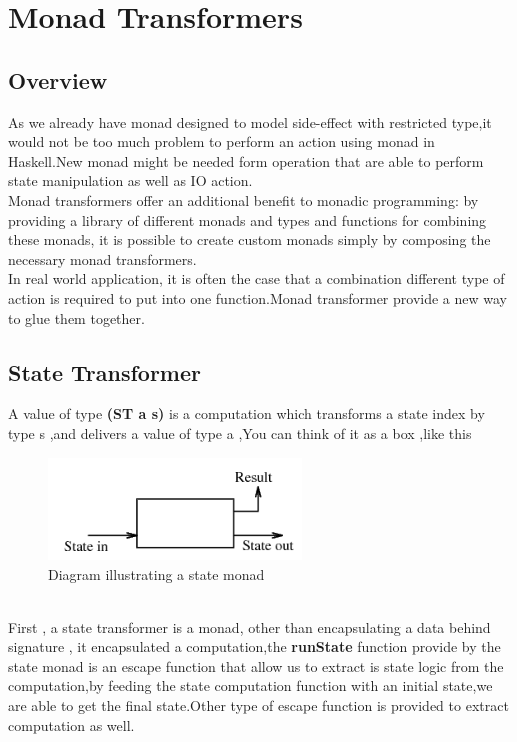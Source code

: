 \chapter{Monad Transformers}
\section{Overview}

As we already have monad designed to model side-effect with restricted type,it would not be too much problem to perform an action using monad in Haskell.New monad might be needed form operation that are able to perform state manipulation as well as IO action.\\

Monad transformers offer an additional benefit to monadic programming: by providing a
library of different monads and types and functions for combining these monads, it is possible
to create custom monads simply by composing the necessary monad transformers. \cite{step} \\

In real world application, it is often the case that a combination different type of action is required to put into one function.Monad transformer provide a new way to glue them together.

\section{State Transformer}
A value of type \textbf{(ST a s)} is a computation which transforms a state index by type s ,and delivers a value of type a ,You can think of it as a box ,like this 
\begin{figure}[H]
  \centering
	\includegraphics[width=0.60\textwidth]{pic/c3/state.png}
	\caption{Diagram illustrating a state monad}
\end{figure}\cite{lazy1}
\\

First , a state transformer is a monad, other than encapsulating a data behind signature , it encapsulated a computation,the \textbf{runState} function provide by the state monad is an escape function that allow us to extract is state logic from the computation,by feeding the state computation function with an initial state,we are able to get the final state.Other type of escape function is provided to extract computation as well.

